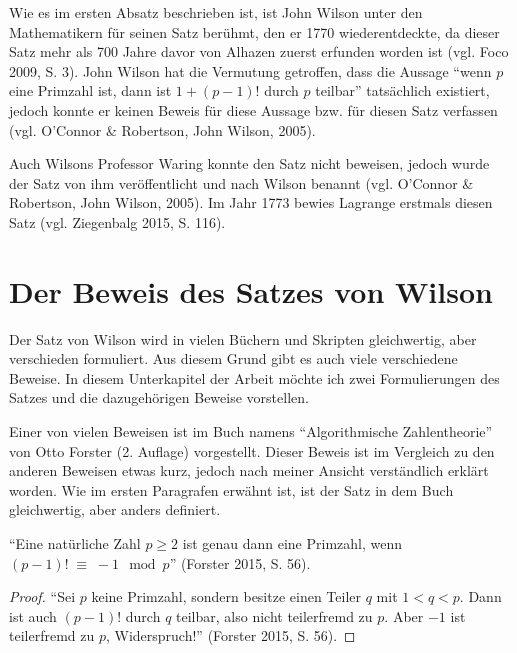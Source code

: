 Wie es im ersten Absatz beschrieben ist, ist John Wilson
unter den Mathematikern für seinen Satz berühmt, den er
1770 wiederentdeckte, da dieser Satz mehr als 700 Jahre
davor von Alhazen zuerst erfunden worden ist
(vgl. Foco 2009, S. 3). John Wilson hat die Vermutung
getroffen, dass die Aussage ``wenn $p$ eine Primzahl ist,
dann ist $1+(p-1)!$ durch $p$ teilbar'' tatsächlich
existiert, jedoch konnte er keinen Beweis für diese
Aussage bzw. für diesen Satz verfassen (vgl.
O'Connor \& Robertson, John Wilson, 2005).

Auch Wilsons Professor Waring konnte den Satz nicht
beweisen, jedoch wurde der Satz von ihm veröffentlicht
und nach Wilson benannt (vgl. O'Connor \& Robertson,
John Wilson, 2005). Im Jahr 1773 bewies Lagrange
erstmals diesen Satz (vgl. Ziegenbalg 2015, S. 116).


\section{Der Beweis des Satzes von Wilson}

Der Satz von Wilson wird in vielen Büchern und Skripten
gleichwertig, aber verschieden formuliert. Aus diesem
Grund gibt es auch viele verschiedene Beweise.
In diesem Unterkapitel der Arbeit möchte ich zwei
Formulierungen des Satzes und die dazugehörigen Beweise
vorstellen.

Einer von vielen Beweisen ist im Buch namens
``Algorithmische Zahlentheorie'' von Otto Forster
(2. Auflage) vorgestellt. Dieser Beweis ist im Vergleich
zu den anderen Beweisen etwas kurz, jedoch nach meiner
Ansicht verständlich erklärt worden. Wie im ersten 
Paragrafen erwähnt ist, ist der Satz in dem Buch
gleichwertig, aber anders definiert.

\begin{theorem}[Wilson]
``Eine natürliche Zahl $p \geq 2$ ist genau dann eine
Primzahl, wenn $(p-1)! \;\equiv\; -1 \mod p$''
(Forster 2015, S. 56).
\end{theorem}
\vspace{-.7cm}

\begin{proof}
 ``Sei $p$ keine Primzahl, sondern besitze einen Teiler
 $q$ mit $1 < q < p$. Dann ist auch $(p-1)!$ durch $q$
 teilbar, also nicht teilerfremd zu $p$. Aber $-1$ ist
 teilerfremd zu $p$, Widerspruch!'' (Forster 2015, S. 56).
\end{proof}


